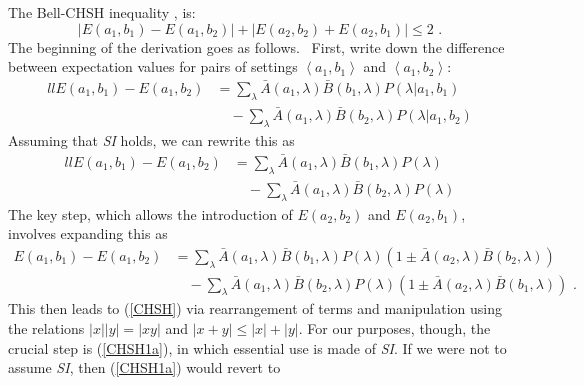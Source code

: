 \documentclass[12pt]{article}%
\begin{document}
The Bell-CHSH inequality \cite{CHSH69}, is:%
\begin{equation}
\left\vert E(a_{1},b_{1})-E(a_{1},b_{2})\right\vert +\left\vert E(a_{2}%
,b_{2})+E(a_{2},b_{1})\right\vert \leq2\text{ .} \label{CHSH}%
\end{equation}
The beginning of the derivation goes as follows. \ First, write down the
difference between expectation values for pairs of settings $\left\langle
a_{1},b_{1}\right\rangle $ and $\left\langle a_{1},b_{2}\right\rangle :$%
\begin{align}%
[c]{ll}%
E(a_{1},b_{1})-E(a_{1},b_{2}) & =%
{\displaystyle\sum\limits_{\lambda}}
\bar{A}(a_{1},\lambda)\bar{B}(b_{1},\lambda)P(\lambda|a_{1},b_{1})\nonumber\\
& \quad -%
{\displaystyle\sum\limits_{\lambda}}
\bar{A}(a_{1},\lambda)\bar{B}(b_{2},\lambda)P(\lambda|a_{1},b_{2})
\label{CHSH1}%
\end{align}
Assuming that \emph{SI} holds, we can rewrite this as%
\begin{align}%
[c]{ll}%
E(a_{1},b_{1})-E(a_{1},b_{2})  & =%
{\displaystyle\sum\limits_{\lambda}}
\bar{A}(a_{1},\lambda)\bar{B}(b_{1},\lambda)P(\lambda)\nonumber\\
& \quad -%
{\displaystyle\sum\limits_{\lambda}}
\bar{A}(a_{1},\lambda)\bar{B}(b_{2},\lambda)P(\lambda)
\label{CHSH1a}%
\end{align}
The key step, which allows the introduction of $E(a_{2},b_{2})$ and
$E(a_{2},b_{1})$, involves expanding this as
\begin{align}
E(a_{1},b_{1})-E(a_{1},b_{2}) &=
{\displaystyle\sum\limits_{\lambda}}
\bar{A}(a_{1},\lambda)\bar{B}(b_{1},\lambda)P(\lambda)(1\pm\bar{A}%
(a_{2},\lambda)\bar{B}(b_{2},\lambda))\nonumber \\
& \quad - 
{\displaystyle\sum\limits_{\lambda}}
\bar{A}(a_{1},\lambda)\bar{B}(b_{2},\lambda)P(\lambda)(1\pm\bar{A}%
(a_{2},\lambda)\bar{B}(b_{1},\lambda))\text{ .}%
\label{CHSH1b}%
\end{align}
This then leads to (\ref{CHSH}) via rearrangement of terms and manipulation
using the relations $\left\vert x\right\vert \left\vert y\right\vert
=\left\vert xy\right\vert $ and $\left\vert x+y\right\vert \leq\left\vert
x\right\vert +\left\vert y\right\vert $. For our purposes, though, the crucial
step is (\ref{CHSH1a}), in which essential use is made of \emph{SI}. If we
were not to assume \emph{SI}, then (\ref{CHSH1a}) would revert to
\end{document}

